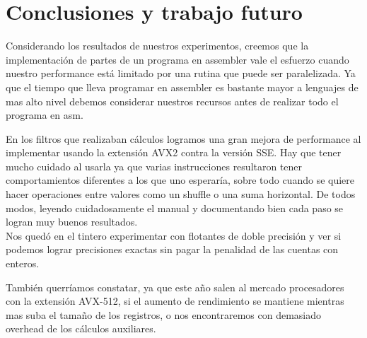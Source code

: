 \section{Conclusiones y trabajo futuro}

Considerando los resultados de nuestros experimentos, creemos que la implementación de partes de un programa en assembler vale el esfuerzo cuando nuestro performance está limitado por una rutina que puede ser paralelizada. Ya que el tiempo que lleva programar en assembler es bastante mayor a lenguajes de mas alto nivel debemos considerar nuestros recursos antes de realizar todo el programa en asm.

En los filtros que realizaban cálculos logramos una gran mejora de performance al implementar usando la extensión AVX2 contra la versión SSE. Hay que tener mucho cuidado al usarla ya que varias instrucciones resultaron tener comportamientos diferentes a los que uno esperaría, sobre todo cuando se quiere hacer operaciones entre valores como un shuffle o una suma horizontal. De todos modos, leyendo cuidadosamente el manual y documentando bien cada paso se logran muy buenos resultados.
\\

Nos quedó en el tintero experimentar con flotantes de doble precisión y ver si podemos lograr precisiones exactas sin pagar la penalidad de las cuentas con enteros.

También querríamos constatar, ya que este año salen al mercado procesadores con la extensión AVX-512, si el aumento de rendimiento se mantiene mientras mas suba el tamaño de los registros, o nos encontraremos con demasiado overhead de los cálculos auxiliares.

